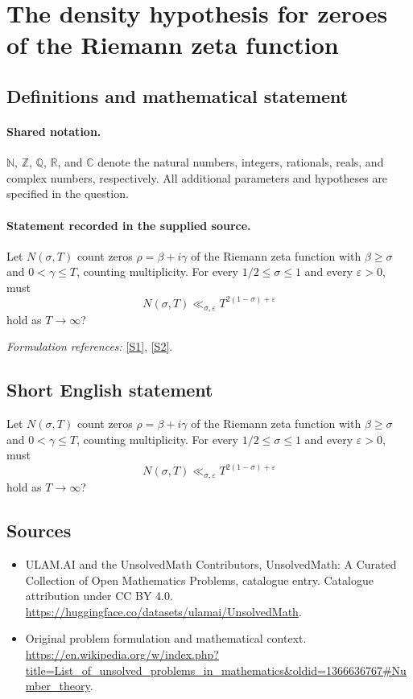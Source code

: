 \documentclass[11pt]{article}
\newcommand{\sref}[2]{\hyperlink{source:#1:#2}{[S#2]}}
\begin{document}
\section{The density hypothesis for zeroes of the Riemann zeta function}\label{statement}

\subsection{Definitions and mathematical statement}

\paragraph{Shared notation.}$\mathbb N$, $\mathbb Z$, $\mathbb Q$, $\mathbb R$, and $\mathbb C$ denote the natural numbers, integers, rationals, reals, and complex numbers, respectively. All additional parameters and hypotheses are specified in the question.


\paragraph{Statement recorded in the supplied source.}
Let $N(\sigma,T)$ count zeros $\rho=\beta+i\gamma$ of the Riemann zeta function with $\beta\geq\sigma$ and $0<\gamma\leq T$, counting multiplicity. For every $1/2\leq\sigma\leq1$ and every $\varepsilon>0$, must
\[N(\sigma,T)\ll_{\sigma,\varepsilon}T^{2(1-\sigma)+\varepsilon}\]
hold as $T\to\infty$?
\par\smallskip\textit{Formulation references:} \sref{statement}{1}, \sref{statement}{2}.
\subsection{Short English statement}
Let $N(\sigma,T)$ count zeros $\rho=\beta+i\gamma$ of the Riemann zeta function with $\beta\geq\sigma$ and $0<\gamma\leq T$, counting multiplicity. For every $1/2\leq\sigma\leq1$ and every $\varepsilon>0$, must
\[N(\sigma,T)\ll_{\sigma,\varepsilon}T^{2(1-\sigma)+\varepsilon}\]
hold as $T\to\infty$?
\subsection{Sources}
\begin{itemize}
\item[\hypertarget{source:statement:1}{S1}] ULAM.AI and the UnsolvedMath Contributors, UnsolvedMath: A Curated Collection of Open Mathematics Problems, catalogue entry. Catalogue attribution under CC BY 4.0.
\url{https://huggingface.co/datasets/ulamai/UnsolvedMath}.
\item[\hypertarget{source:statement:2}{S2}] Original problem formulation and mathematical context.
\url{https://en.wikipedia.org/w/index.php?title=List_of_unsolved_problems_in_mathematics&oldid=1366636767#Number_theory}.
\end{itemize}
\label{end:statement}
\end{document}
